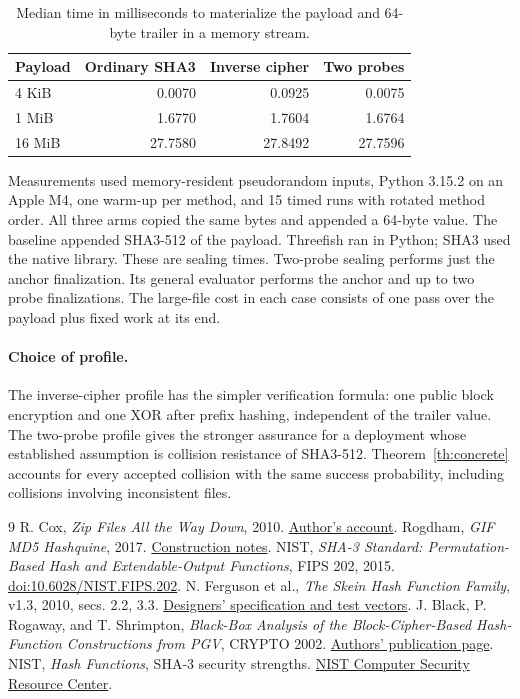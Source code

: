 \documentclass[10pt,twocolumn,letterpaper]{article}
\begin{document}
\begin{table}[ht]
\centering\small
\caption{Median time in milliseconds to materialize the payload and 64-byte trailer in a memory stream.}
\begin{tabular}{@{}lrrr@{}}
\toprule
Payload & Ordinary SHA3 & Inverse cipher & Two probes\\
\midrule
4 KiB & 0.0070 & 0.0925 & 0.0075\\
1 MiB & 1.6770 & 1.7604 & 1.6764\\
16 MiB & 27.7580 & 27.8492 & 27.7596\\
\bottomrule
\end{tabular}
\end{table}
Measurements used memory-resident pseudorandom inputs, Python 3.15.2 on an Apple M4, one warm-up per method, and 15 timed runs with rotated method order. All three arms copied the same bytes and appended a 64-byte value. The baseline appended SHA3-512 of the payload. Threefish ran in Python; SHA3 used the native library. These are sealing times. Two-probe sealing performs just the anchor finalization. Its general evaluator performs the anchor and up to two probe finalizations. The large-file cost in each case consists of one pass over the payload plus fixed work at its end.

\paragraph{Choice of profile.}
The inverse-cipher profile has the simpler verification formula: one public block encryption and one XOR after prefix hashing, independent of the trailer value. The two-probe profile gives the stronger assurance for a deployment whose established assumption is collision resistance of SHA3-512. Theorem~\ref{th:concrete} accounts for every accepted collision with the same success probability, including collisions involving inconsistent files.

\balance
\begin{thebibliography}{9}\small
{} R. Cox, \emph{Zip Files All the Way Down}, 2010. \href{https://research.swtch.com/zip}{Author's account}.
 Rogdham, \emph{GIF MD5 Hashquine}, 2017. \href{https://www.rogdham.net/2017/03/12/gif-md5-hashquine.en}{Construction notes}.
 NIST, \emph{SHA-3 Standard: Permutation-Based Hash and Extendable-Output Functions}, FIPS 202, 2015. \href{https://doi.org/10.6028/NIST.FIPS.202}{doi:10.6028/NIST.FIPS.202}.
 N. Ferguson et al., \emph{The Skein Hash Function Family}, v1.3, 2010, secs. 2.2, 3.3. \href{https://www.schneier.com/academic/skein/threefish/}{Designers' specification and test vectors}.
 J. Black, P. Rogaway, and T. Shrimpton, \emph{Black-Box Analysis of the Block-Cipher-Based Hash-Function Constructions from PGV}, CRYPTO 2002. \href{https://web.cs.ucdavis.edu/~rogaway/papers/hash.htm}{Authors' publication page}.
 NIST, \emph{Hash Functions}, SHA-3 security strengths. \href{https://csrc.nist.gov/projects/hash-functions}{NIST Computer Security Resource Center}.
\end{thebibliography}
\end{document}
